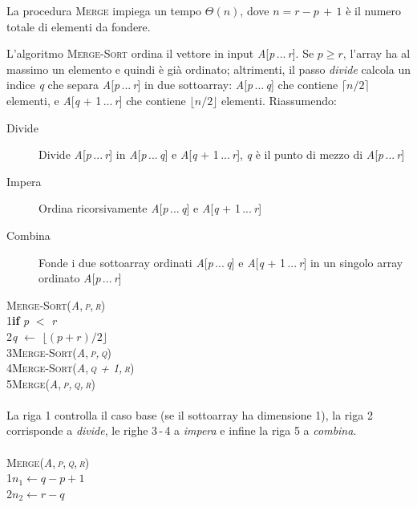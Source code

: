 \documentclass[10pt, a4paper]{report}
\newcommand\firsttab[1][0.5cm]{\hspace*{#1}}
\newcommand\secondtab[1][1cm]{\hspace*{#1}}
\begin{document}
La procedura \textsc{Merge} impiega un tempo $\Theta(n)$, dove $n = r - p \,+\, 1$ è il numero totale di elementi da fondere.

L'algoritmo \textsc{Merge-Sort} ordina il vettore in input \textit{A}[\textit{p}\,...\,\textit{r}]. Se $p \geq r$, l'array ha al massimo un elemento e quindi è già ordinato; altrimenti, il passo \textsl{divide} calcola un indice \textit{q} che separa \textit{A}[\textit{p}\,...\,\textit{r}] in due sottoarray: \textit{A}[\textit{p}\,...\,\textit{q}] che contiene $\lceil n/2 \rceil$ elementi, e \textit{A}[\textit{q} + 1\,...\,\textit{r}] che contiene $\lfloor n/2 \rfloor$ elementi. Riassumendo:
\begin{description}
\item[Divide]Divide \textit{A}[\textit{p}\,...\,\textit{r}] in \textit{A}[\textit{p}\,...\,\textit{q}] e \textit{A}[\textit{q} + 1\,...\,\textit{r}], \textit{q} è il punto di mezzo di \textit{A}[\textit{p}\,...\,\textit{r}]
\item[Impera]Ordina ricorsivamente \textit{A}[\textit{p}\,...\,\textit{q}] e \textit{A}[\textit{q} + 1\,...\,\textit{r}]
\item[Combina]Fonde i due sottoarray ordinati \textit{A}[\textit{p}\,...\,\textit{q}] e \textit{A}[\textit{q} + 1\,...\,\textit{r}] in un singolo array ordinato \textit{A}[\textit{p}\,...\,\textit{r}]
\end{description}
\textsc{Merge-Sort(\textit{A},\,\textit{p},\,\textit{r})}\\
1\firsttab \textbf{if} \textit{p} $<$ \textit{r}\\
2\secondtab \textit{q} $\leftarrow$ $\lfloor (p + r)/2 \rfloor$\\
3\secondtab \textsc{Merge-Sort(\textit{A},\textit{\,p,\,q})}\\
4\secondtab \textsc{Merge-Sort(\textit{A},\textit{\,q + 1,\,r})}\\
5\secondtab \textsc{Merge(\textit{A},\textit{\,p,\,q,\,r})}\\\\
La riga 1 controlla il caso base (se il sottoarray ha dimensione 1), la riga 2 corrisponde a \textsl{divide}, le righe 3\,-\,4 a \textsl{impera} e infine la riga 5 a \textsl{combina}.\\\\
\textsc{Merge(\textit{A},\,\textit{p},\,\textit{q},\,\textit{r})}\\
1\firsttab $n_1 \leftarrow q - p + 1$\\
2\firsttab $n_2 \leftarrow r - q$\\
\end{document}
